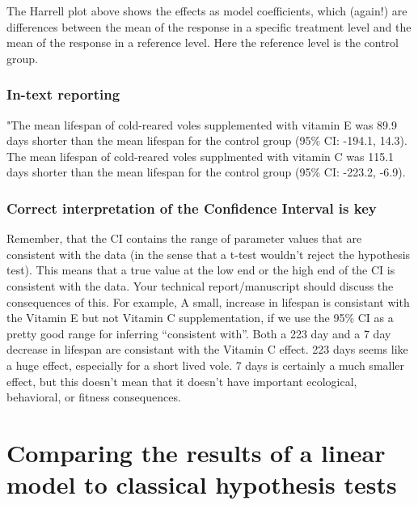 \documentclass[]{book}
\begin{document}
The Harrell plot above shows the effects as model coefficients, which (again!) are differences between the mean of the response in a specific treatment level and the mean of the response in a reference level. Here the reference level is the control group.

\hypertarget{in-text-reporting}{%
\subsubsection{In-text reporting}\label{in-text-reporting}}

"The mean lifespan of cold-reared voles supplemented with vitamin E was 89.9 days shorter than the mean lifespan for the control group (95\% CI: -194.1, 14.3). The mean lifespan of cold-reared voles supplmented with vitamin C was 115.1 days shorter than the mean lifespan for the control group (95\% CI: -223.2, -6.9).

\hypertarget{correct-interpretation-of-the-confidence-interval-is-key}{%
\subsubsection{Correct interpretation of the Confidence Interval is key}\label{correct-interpretation-of-the-confidence-interval-is-key}}

Remember, that the CI contains the range of parameter values that are consistent with the data (in the sense that a t-test wouldn't reject the hypothesis test). This means that a true value at the low end or the high end of the CI is consistent with the data. Your technical report/manuscript should discuss the consequences of this. For example, A small, increase in lifespan is consistant with the Vitamin E but not Vitamin C supplementation, if we use the 95\% CI as a pretty good range for inferring ``consistent with''. Both a 223 day and a 7 day decrease in lifespan are consistant with the Vitamin C effect. 223 days seems like a huge effect, especially for a short lived vole. 7 days is certainly a much smaller effect, but this doesn't mean that it doesn't have important ecological, behavioral, or fitness consequences.

\hypertarget{comparing-the-results-of-a-linear-model-to-classical-hypothesis-tests}{%
\section{Comparing the results of a linear model to classical hypothesis tests}\label{comparing-the-results-of-a-linear-model-to-classical-hypothesis-tests}}
\end{document}
